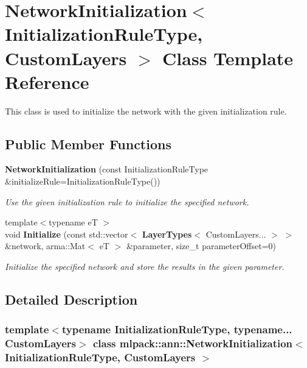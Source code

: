 \section{Network\+Initialization$<$ Initialization\+Rule\+Type, Custom\+Layers $>$ Class Template Reference}
\label{classmlpack_1_1ann_1_1NetworkInitialization}


This class is used to initialize the network with the given initialization rule.  


\subsection*{Public Member Functions}
\begin{DoxyCompactItemize}
\item 
\textbf{ Network\+Initialization} (const Initialization\+Rule\+Type \&initialize\+Rule=Initialization\+Rule\+Type())
\begin{DoxyCompactList}\small\item\em Use the given initialization rule to initialize the specified network. \end{DoxyCompactList}\item 
{\footnotesize template$<$typename eT $>$ }\\void \textbf{ Initialize} (const std\+::vector$<$ \textbf{ Layer\+Types}$<$ Custom\+Layers... $>$ $>$ \&network, arma\+::\+Mat$<$ eT $>$ \&parameter, size\+\_\+t parameter\+Offset=0)
\begin{DoxyCompactList}\small\item\em Initialize the specified network and store the results in the given parameter. \end{DoxyCompactList}\end{DoxyCompactItemize}


\subsection{Detailed Description}
\subsubsection*{template$<$typename Initialization\+Rule\+Type, typename... Custom\+Layers$>$\newline
class mlpack\+::ann\+::\+Network\+Initialization$<$ Initialization\+Rule\+Type, Custom\+Layers $>$}

